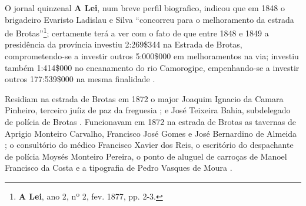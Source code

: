 
O jornal quinzenal \textbf{A Lei}, num breve perfil biografico, indicou que em 1848 o brigadeiro Evaristo Ladislau e Silva ``concorreu para o melhoramento da estrada de Brotas''\footnote{\textbf{A Lei}, ano 2, nº 2, fev. 1877, pp. 2-3.}; certamente terá a ver com o fato de que entre 1848 e 1849 a presidência da província investiu 2:269\$344 na Estrada de Brotas, comprometendo-se a investir outros 5:000\$000 em melhoramentos na via; investiu também 1:414\$000 no encanamento do rio Camorogipe, empenhando-se a investir outros 177:539\$000 na mesma finalidade \cite{bahia_rpe_1849}.

Residiam na estrada de Brotas em 1872 o major Joaquim Ignacio da Camara Pinheiro, terceiro juíiz de paz da freguesia \cite[segunda~parte, p.~91]{pimenta_almanak_1872}; e José Teixeira Bahia, subdelegado de polícia de Brotas \cite[segunda~parte, pp.~132]{pimenta_almanak_1872}. Funcionavam em 1872 na estrada de Brotas as tavernas de Aprigio Monteiro Carvalho, Francisco José Gomes e José Bernardino de Almeida \cite[terceira~parte, pp.~39, 42, 43]{pimenta_almanak_1872}; o consultório do médico Francisco Xavier dos Reis, o escritório do despachante de polícia Moysés Monteiro Pereira, o ponto de aluguel de carroças de Manoel Francisco da Costa e a tipografia de Pedro Vasques de Moura \cite[quarta~parte, pp.~4, 10, 20, 38]{pimenta_almanak_1872}.

